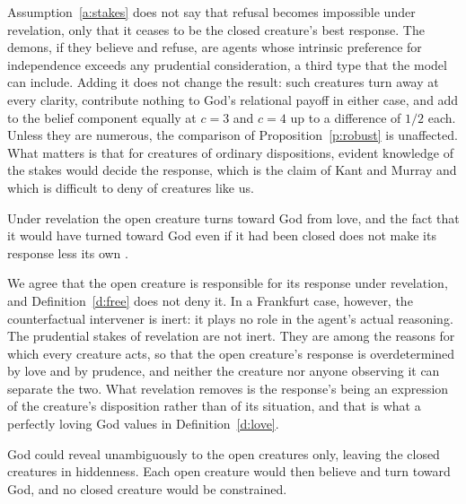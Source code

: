 \documentclass{situationist-preprint}
\begin{document}
\begin{reply}
Assumption~\ref{a:stakes} does not say that refusal becomes impossible under revelation, only that it ceases to be the closed creature's best response. The demons, if they believe and refuse, are agents whose intrinsic preference for independence exceeds any prudential consideration, a third type that the model can include. Adding it does not change the result: such creatures turn away at every clarity, contribute nothing to God's relational payoff in either case, and add to the belief component equally at $c = 3$ and $c = 4$ up to a difference of $1/2$ each. Unless they are numerous, the comparison of Proposition~\ref{p:robust} is unaffected. What matters is that for creatures of ordinary dispositions, evident knowledge of the stakes would decide the response, which is the claim of Kant and Murray and which is difficult to deny of creatures like us.
\end{reply}

\begin{objection}[Frankfurt]
Under revelation the open creature turns toward God from love, and the fact that it would have turned toward God even if it had been closed does not make its response less its own \citep{Frankfurt1969}.
\end{objection}

\begin{reply}
We agree that the open creature is responsible for its response under revelation, and Definition~\ref{d:free} does not deny it. In a Frankfurt case, however, the counterfactual intervener is inert: it plays no role in the agent's actual reasoning. The prudential stakes of revelation are not inert. They are among the reasons for which every creature acts, so that the open creature's response is overdetermined by love and by prudence, and neither the creature nor anyone observing it can separate the two. What revelation removes is the response's being an expression of the creature's disposition rather than of its situation, and that is what a perfectly loving God values in Definition~\ref{d:love}.
\end{reply}

\begin{objection}
God could reveal unambiguously to the open creatures only, leaving the closed creatures in hiddenness. Each open creature would then believe and turn toward God, and no closed creature would be constrained.
\end{objection}
\end{document}
